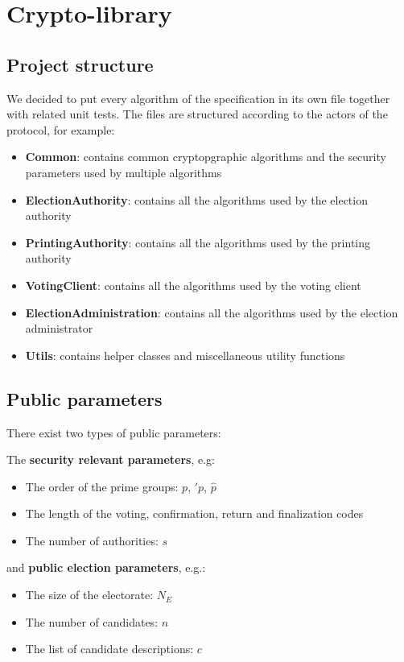 \section{Crypto-library}

\subsection{Project structure}
We decided to put every algorithm of the specification in its own file together with related unit tests. The files are structured according to the actors of the protocol, for example:

\begin{itemize}
	\item \textbf{Common}: contains common cryptopgraphic algorithms and the security parameters used by multiple algorithms
	\item \textbf{ElectionAuthority}: contains all the algorithms used by the election authority
	\item \textbf{PrintingAuthority}: contains all the algorithms used by the printing authority
	\item \textbf{VotingClient}: contains all the algorithms used by the voting client
	\item \textbf{ElectionAdministration}: contains all the algorithms used by the election administrator
	\item \textbf{Utils}: contains helper classes and miscellaneous utility functions
\end{itemize}

\subsection{Public parameters}
There exist two types of public parameters:

The \textbf{security relevant parameters}, e.g:

\begin{itemize}
	\item The order of the prime groups: $p$, $\prime{p}$, $\hat{p}$
	\item The length of the voting, confirmation, return and finalization codes
	\item The number of authorities: $s$
\end{itemize}

and \textbf{public election parameters}, e.g.:

\begin{itemize}
	\item The size of the electorate: $N_E$
	\item The number of candidates: $n$
	\item The list of candidate descriptions: $c$
\end{itemize}

